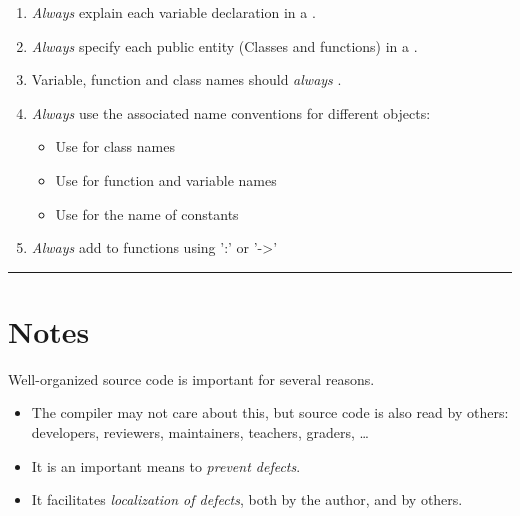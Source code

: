 \documentclass[a4paper,11pt]{article}
\begin{document}
\begin{enumerate}
\item\label{it:comments}
\emph{Always\/} explain each variable declaration in a .

\item\label{it:docstring}
\emph{Always\/} specify each public entity (Classes and functions) 
in a .

\item\label{it:naming-1}
Variable, function and class names should \emph{always\/} 
.

\item\label{it:naming-2}
\emph{Always\/} use the associated name conventions for different objects:
\begin{itemize}
\item Use  for class names
\item Use  for function and variable names
\item Use  for the name of constants
\end{itemize}

\item\label{it:type-hints}
\emph{Always\/} add  to functions using ':' or '->'

\end{enumerate}

\newpage

\enlargethispage{\baselineskip}

\hrule{}



\section* {Notes}

Well-organized source code is important for several reasons.
\begin{itemize}
\item The compiler may not care about this,
  but source code is also read by others:
  developers, reviewers, maintainers, teachers, graders, \ldots
\item It is an important means to \emph{prevent defects}.
\item It facilitates \emph{localization of defects},
  both by the author, and by others.
\end{itemize}
\end{document}
